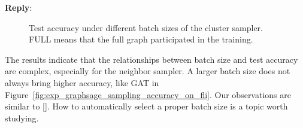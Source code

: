 \documentclass[12pt]{article}
\newenvironment{reply}
   {\medskip \noindent \textbf{Reply}:\  }
   {\medskip}
\begin{document}
\begin{reply}
        \begin{figure}[h]
            \centering
            \caption{Test accuracy under different batch sizes of the cluster sampler. FULL means that the full graph participated in the training.}
            \label{fig:exp_sampling_relative_batch_size_accuracy_cluster}
        \end{figure}
    
    The results indicate that the relationships between batch size and test accuracy are complex, especially for the neighbor sampler.
    A larger batch size does not always bring higher accuracy, like GAT in Figure~\ref{fig:exp_graphsage_sampling_accuracy_on_fli}. 
    Our observations are similar to [\cite{zeng2020_graphsaint}].
    How to automatically select a proper batch size is a topic worth studying.
\end{reply}
\end{document}
